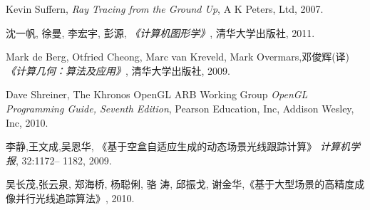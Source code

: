 \documentclass[10pt,twocolumn]{article}
\begin{document}
\begin{thebibliography}{10}

 Kevin Suffern, \emph{Ray Tracing from the Ground Up}, A K Peters, Ltd, 2007.
 
 
 沈一帆, 徐曼, 李宏宇, 彭源, \emph{《计算机图形学》}, 清华大学出版社, 2011.

 Mark de Berg, Otfried Cheong, Marc van Kreveld, Mark Overmars,邓俊辉(译) \emph{《计算几何：算法及应用》}, 清华大学出版社, 2009.

 Dave Shreiner, The Khronos OpenGL ARB Working Group \emph{OpenGL Programming Guide, Seventh Edition}, Pearson Education, Inc, Addison Wesley, Inc, 2010.

 李静,王文成,吴恩华, 《基于空盒自适应生成的动态场景光线跟踪计算》 \emph{计算机学报}, 32:1172– 1182, 2009.

 吴长茂,张云泉, 郑海桥, 杨聪俐, 骆 涛, 邱振戈, 谢金华,《基于大型场景的高精度成像并行光线追踪算法》, 2010.

\end{thebibliography}
\end{document}
